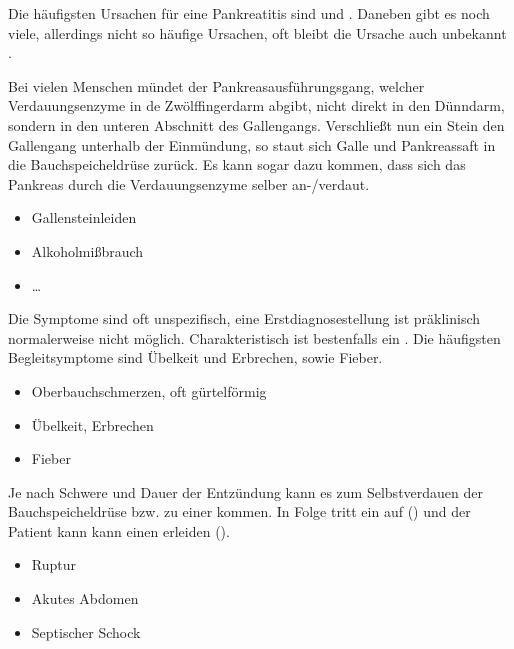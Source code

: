 {
Die häufigsten Ursachen für eine Pankreatitis sind
 und 
\citep{SiewertChirurgie8-07.14-Pankreas,ScholzNotfallmedizin2}.
Daneben gibt es noch viele, allerdings nicht so häufige
Ursachen, oft bleibt die Ursache auch unbekannt
\citep{HeroldInnereMedizin2005}.

 Bei vielen Menschen mündet der
Pankreasausführungsgang, welcher Verdauungsenzyme in de
Zwölffingerdarm abgibt, nicht direkt in den Dünndarm,
sondern in den unteren Abschnitt des Gallengangs.
Verschließt nun ein Stein den Gallengang unterhalb der
Einmündung, so staut sich Galle und Pankreassaft in die
Bauchspeicheldrüse zurück. Es kann sogar dazu kommen, dass
sich das Pankreas durch die Verdauungsenzyme selber
an-/verdaut.

}
{\begin{itemize}
  \item Gallensteinleiden
  \item Alkoholmißbrauch
  \item \ldots
\end{itemize}}
{}
{}
{}

{Die Symptome sind oft unspezifisch, eine
Erstdiagnosestellung ist präklinisch normalerweise nicht
möglich. Charakteristisch ist bestenfalls ein
.
Die häufigsten Begleitsymptome sind Übelkeit und Erbrechen,
sowie Fieber. \citep{HeroldInnereMedizin2005}


\bigskip

\bigskip
}
{\begin{itemize}
  \item Oberbauchschmerzen, oft gürtelförmig
  \item Übelkeit, Erbrechen
  \item Fieber
\end{itemize}}
{}
{}
{}

{Je nach Schwere und Dauer der Entzündung kann es zum
Selbstverdauen der Bauchspeicheldrüse bzw. zu einer
 kommen. In Folge tritt ein
 auf
() und der Patient kann
kann einen  erleiden ().

\bigskip

}
{\begin{itemize}
  \item Ruptur
  \item Akutes Abdomen
  \item Septischer Schock
\end{itemize}}
{}
{}
{}

